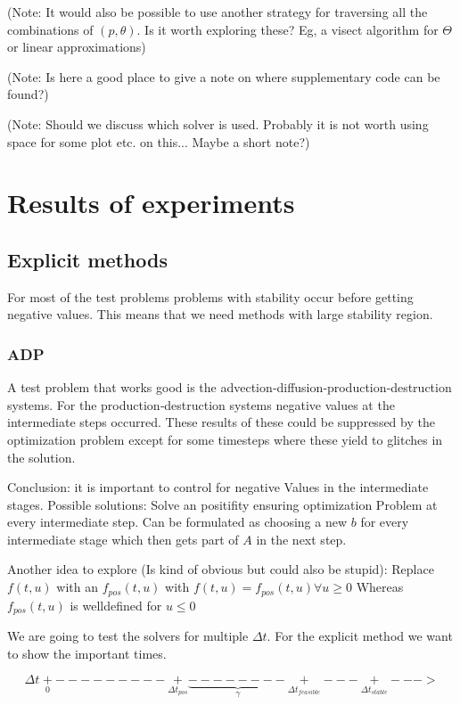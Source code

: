 \documentclass{article}
\begin{document}
(Note: It would also be possible to use another strategy for traversing all the combinations of $(p,\theta)$. Is it worth exploring these? Eg, a visect algorithm for $\Theta$ or linear approximations)

(Note: Is here a good place to give a note on where supplementary code can be found?)

(Note: Should we discuss which solver is used. Probably it is not worth using space for some plot etc. on this... Maybe a short note?)



\section{Results of experiments}
\subsection{Explicit methods}
For most of the test problems problems with stability occur before getting negative values. This means that we need methods with large stability region.

\subsubsection{ADP}
A test problem that works good is the advection‐diffusion‐production‐destruction systems. 
For the production‐destruction systems negative values at the intermediate steps occurred. These results of these could be suppressed by the optimization problem  except for some timesteps where these yield to glitches in the solution.

Conclusion: it is important to control for negative Values in the intermediate stages.
Possible solutions: Solve an positifity ensuring optimization Problem at every intermediate step.
Can be formulated as choosing a new $b$ for every intermediate stage which then gets part of $A$ in the next step.

Another idea to explore (Is kind of obvious but could also be stupid): Replace $f(t,u)$ with an $f_{pos}(t,u)$ with 
$f(t,u)=f_{pos}(t,u) \forall u \geq 0 $
Whereas $f_{pos}(t,u)$ is welldefined for $u \leq 0$


We are going to test the solvers for multiple $\Delta t$. For the explicit method we want to show the important times.

$$ \Delta t \; \underset{0}{+}---------\underset{\Delta t_{pos}}{+}\underbrace{--------}_{\gamma}\underset{\Delta t_{feasible}}{+}---\underset{\Delta t_{stable}}{+}--->  $$
\end{document}
